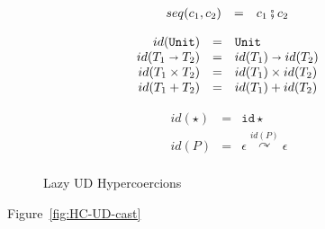 \documentclass[acmsmall,review,anonymous]{acmart}\settopmatter{printfolios=true,printccs=false,printacmref=false}
\newcommand{\funrule}[3]{#1 &=& #2 & #3\\}
\newcommand{\plus}[0]{+}
\newcommand{\POOunit}[0]{\mathtt{Unit}}
\newcommand{\POOfun}[2]{#1 \shortrightarrow #2}
\newcommand{\POOprod}[2]{#1 \times #2}
\newcommand{\POOsum}[2]{#1 \plus #2}
\newcommand{\hyperCoercionI}[0]{\mathtt{id\star}}
\newcommand{\hyperCoercionC}[3]{#1 \overset{#2}{\curvearrowright} #3}
\begin{document}
\begin{figure}
  \[
  \begin{array}{rclr}
    \funrule{seq(c_1,c_2)}{
      c_1 \fatsemi c_2
    }{}
  \end{array}
  \]
  
  \[
  \begin{array}{rclr}
    \funrule{id(\POOunit)}{\POOunit}{}
    \funrule{id(\POOfun{T_1}{T_2})}{
		\POOfun{id(T_1)}{id(T_2)}
    }{}
    \funrule{id(\POOprod{T_1}{T_2})}{
		\POOprod{id(T_1)}{id(T_2)}
    }{}
    \funrule{id(\POOsum{T_1}{T_2})}{
		\POOsum{id(T_1)}{id(T_2)}
    }{}
  \end{array}
  \]
  
  \[
  \begin{array}{rclr}
    \funrule{id(\star)}{
		\hyperCoercionI
    }{}
    \funrule{id(P)}{
		\hyperCoercionC{\epsilon}{id(P)}{\epsilon}
    }{}
  \end{array}
  \]

  
  \caption{Lazy UD Hypercoercions}
  \label{fig:HC-UD}
\end{figure}


Figure~\ref{fig:HC-UD-cast}
\end{document}
